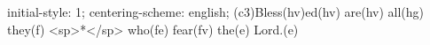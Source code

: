 initial-style: 1;
centering-scheme: english;
(c3)Bless(hv)ed(hv) are(hv) all(hg) they(f) <sp>*</sp> who(fe) fear(fv) the(e) Lord.(e)
